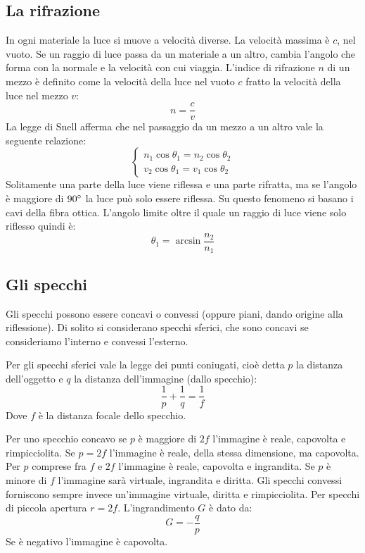 \documentclass{article}
\begin{document}
\subsection{La rifrazione}
In ogni materiale la luce si muove a velocità diverse. La velocità massima è $c$, nel vuoto. Se un raggio di luce passa da un materiale a un altro, cambia l'angolo che forma con la normale e la velocità con cui viaggia.
L'indice di rifrazione $n$ di un mezzo è definito come la velocità della luce nel vuoto $c$ fratto la velocità della luce nel mezzo $v$:
\begin{equation}
    n=\frac{c}{v}
\end{equation}
La legge di Snell afferma che nel passaggio da un mezzo a un altro vale la seguente relazione:
\begin{equation}
    \begin{cases}
        n_1 \cos{\theta_1}= n_2 \cos{\theta_2} \\
        v_2 \cos{\theta_1}= v_1 \cos{\theta_2}
    \end{cases}
\end{equation}
Solitamente una parte della luce viene riflessa e una parte rifratta, ma se l'angolo è maggiore di $90^{\small\circ}$ la luce può solo essere riflessa. Su questo fenomeno si basano i cavi della fibra ottica.
L'angolo limite oltre il quale un raggio di luce viene solo riflesso quindi è:
\begin{equation}
    \theta_{1}=\arcsin{\frac{n_2}{n_1}}
\end{equation}


\subsection{Gli specchi}
Gli specchi possono essere concavi o convessi (oppure piani, dando origine alla riflessione). Di solito si considerano specchi sferici, che sono concavi se consideriamo l'interno e convessi l'esterno.

Per gli specchi sferici vale la legge dei punti coniugati, cioè detta $p$ la distanza dell'oggetto e $q$ la distanza dell'immagine (dallo specchio):
\begin{equation}
    \frac{1}{p}+\frac{1}{q}=\frac{1}{f}
\end{equation}
Dove $f$ è la distanza focale dello specchio.

Per uno specchio concavo se $p$ è maggiore di $2f$ l'immagine è reale, capovolta e rimpicciolita. Se $p=2f$ l'immagine è reale, della stessa dimensione, ma capovolta. Per $p$ comprese fra $f$ e $2f$ l'immagine è reale, capovolta e ingrandita. Se $p$ è minore di $f$ l'immagine sarà virtuale, ingrandita e diritta.
Gli specchi convessi forniscono sempre invece un'immagine virtuale, diritta e rimpicciolita.
Per specchi di piccola apertura $r=2f$.
L'ingrandimento $G$ è dato da:
\begin{equation}
    G=-\frac{q}{p}
\end{equation}
Se è negativo l'immagine è capovolta.
\end{document}
